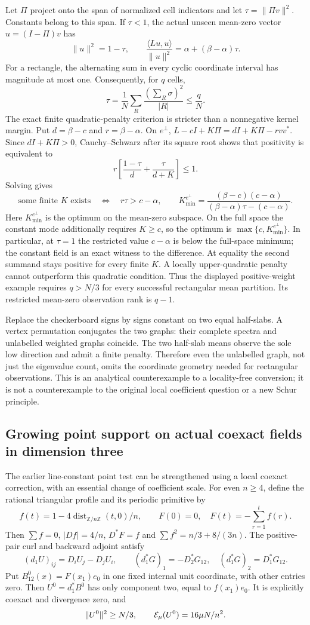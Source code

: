 Let $\Pi$ project onto the span of normalized cell indicators and let
$\tau=\|\Pi v\|^2$. Constants belong to this span. If $\tau<1$, the actual
unseen mean-zero vector $u=(I-\Pi)v$ has
\[
 \|u\|^2=1-\tau,\qquad
 \frac{\langle Lu,u\rangle}{\|u\|^2}
       =\alpha+(\beta-\alpha)\tau.
\]
For a rectangle, the alternating sum in every cyclic coordinate interval
has magnitude at most one. Consequently, for $q$ cells,
\[
 \tau=\frac1N\sum_R\frac{(\sum_R\sigma)^2}{|R|}\leq\frac qN.
\]
The exact finite quadratic-penalty criterion is stricter than a nonnegative
kernel margin. Put $d=\beta-c$ and $r=\beta-\alpha$. On $e^\perp$,
$L-cI+K\Pi=dI+K\Pi-rvv^*$. Since $dI+K\Pi>0$, Cauchy--Schwarz after
its square root shows that positivity is equivalent to
\[
 r\left[\frac{1-\tau}{d}+\frac\tau{d+K}\right]\leq1.
\]
Solving gives
\[
 \text{some finite }K\text{ exists}\quad\Longleftrightarrow\quad
 r\tau>c-\alpha,
 \qquad
 K_{\min}^{e^\perp}=\frac{(\beta-c)(c-\alpha)}{(\beta-\alpha)\tau-(c-\alpha)}.
\]
Here $K_{\min}^{e^\perp}$ is the optimum on the mean-zero subspace.
On the full space the constant mode additionally requires $K\geq c$,
so the optimum is $\max\{c,K_{\min}^{e^\perp}\}$. In particular,
at $\tau=1$ the restricted value $c-\alpha$ is below the full-space
minimum; the constant field is an exact witness to the difference.
At equality the second summand stays positive for every finite $K$.
A locally upper-quadratic penalty cannot outperform this quadratic
condition. Thus the displayed positive-weight example requires $q>N/3$
for every successful rectangular mean partition. Its restricted mean-zero
observation rank is $q-1$.

Replace the checkerboard signs by signs constant on two equal half-slabs.
A vertex permutation conjugates the two graphs: their complete spectra
and unlabelled weighted graphs coincide. The two half-slab means observe
the sole low direction and admit a finite penalty. Therefore even the
unlabelled graph, not just the eigenvalue count, omits the coordinate
geometry needed for rectangular observations. This is an analytical
counterexample to a locality-free conversion; it is not a counterexample
to the original local coefficient question or a new Schur principle.

\subsection{Growing point support on actual coexact fields in dimension three}
The earlier line-constant point test can be strengthened using a local
coexact correction, with an essential change of coefficient scale.
For even $n\geq4$, define the rational triangular profile and its periodic
primitive by
\[
 f(t)=1-4\operatorname{dist}_{\mathbb Z/n\mathbb Z}(t,0)/n,
 \qquad F(0)=0,\quad F(t)=-\sum_{r=1}^t f(r).
\]
Then $\sum f=0$, $|D f|=4/n$, $D^*F=f$ and
$\sum f^2=n/3+8/(3n)$. The positive-pair curl and backward adjoint satisfy
\[
 (d_1U)_{ij}=D_iU_j-D_jU_i,\qquad
 (d_1^*G)_1=-D_2^*G_{12},\quad (d_1^*G)_2=D_1^*G_{12}.
\]
Put $B^0_{12}(x)=F(x_1)e_0$ in one fixed internal unit coordinate, with
other entries zero. Then $U^0=d_1^*B^0$ has only component two, equal to
$f(x_1)e_0$. It is explicitly coexact and divergence zero, and
\[
 \|U^0\|^2\geq N/3,\qquad \mathcal E_\mu(U^0)=16\mu N/n^2.
\]

